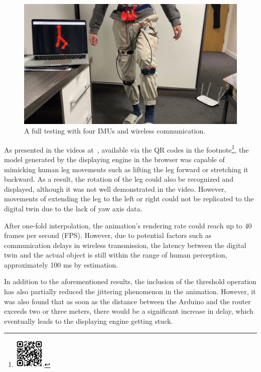 \begin{figure}[htbp]
	\centering
	\includegraphics[width=1\textwidth]{
		fileForWriting/youtube-page}
	\caption[A full testing with four IMUs and wireless communication]{A full testing with four IMUs and wireless communication.}
	\label{fig:youtube-demo}
\end{figure}


As presented in the videos at~\cite{youtube-demo},
available via the QR codes in the
footnote\footnote{\includegraphics[width=1.4cm]{fileForWriting/qrcode-youtube}\cite{youtube-demo}.},
the model generated by the displaying engine in the browser was capable of mimicking human leg movements such as lifting the leg forward or stretching it backward.
As a result, the rotation of the leg could also be recognized and displayed, although it was not well demonstrated in the video.
However, movements of extending the leg to the left or right could not be replicated to the digital twin due to the lack of yaw axis data.

After one-fold interpolation, the animation's rendering rate could reach up to 40 frames per second (FPS)\@.
However, due to potential factors such as communication delays in wireless transmission, the latency between the digital twin and the actual object is still within the range of human perception, approximately 100 ms by estimation.

In addition to the aforementioned results, the inclusion of the threshold operation has also partially reduced the jittering phenomenon in the animation.
However, it was also found that as soon as the distance between the Arduino and the router exceeds two or three meters, there would be a significant increase in delay, which eventually leads to the displaying engine getting stuck.


